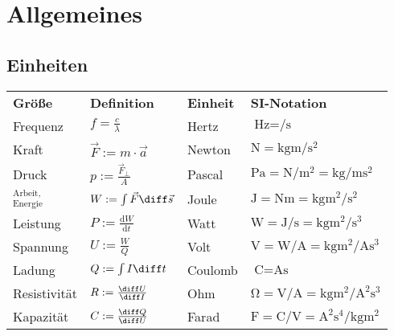 \documentclass[fs, german]{latex4ei_fs}
\begin{document}

\section{Allgemeines}
\begin{sectionbox}
	\subsection{Einheiten}
	\begin{tabular}{llll} \ctrule
		\textbf{Größe} & \textbf{Definition} & \textbf{Einheit} & \textbf{SI-Notation} \\ \cmrule
		Frequenz & $f = \frac{c}{\lambda}$ & Hertz & $\si{\hertz} = \si{ \per \second}$\\
		Kraft & $ \vec F := m \cdot \vec a $ & Newton & $\si{\newton} = \si{\kilogram \meter \per \second \squared}$\\
		Druck & $p := \frac{\vec F_\perp}{A}$ & Pascal & $\si{\pascal} = \si{\newton \per \meter \squared} = \si{\kilogram \per \meter \second \squared}$\\
		${}^{\textstyle \text{Arbeit,}}_{\textstyle \text{Energie}}$ & $W := \int \vec F \diff \vec s$ & Joule & $\si{\joule} = \si{\newton\meter} = \si{\kilogram\meter \squared \per \second \squared}$ \\
		Leistung & $P := \frac{\mathrm dW}{\mathrm dt}$ & Watt & $\si{\watt} = \si{\joule \per \second} = \si{\kilogram\meter \squared \per \second \cubed}$\\
		Spannung & $U := \frac{W}{Q}$ & Volt & $\si{\volt} = \si{\watt \per \ampere} = \si{\kilogram\meter  \squared \per \ampere\second \cubed}$\\
		Ladung & $Q:= \int I \diff t$ & Coulomb & $\si{\coulomb} = \si{\ampere\second}$\\
		Resistivität & $R := \frac{\diff U}{\diff I}$ & Ohm & $\si{\ohm} = \si{\volt \per \ampere} = \si{\kilogram\meter  \squared \per \ampere  \squared\second \cubed}$\\
		Kapazität & $C:= \frac{\diff Q}{\diff U}$ & Farad & $\si{\farad} = \si{\coulomb \per \volt} = \si{\ampere  \squared  \second \tothe{4}\per \kilogram\meter \squared}$\\	

\end{tabular}
\end{sectionbox}
\end{document}
